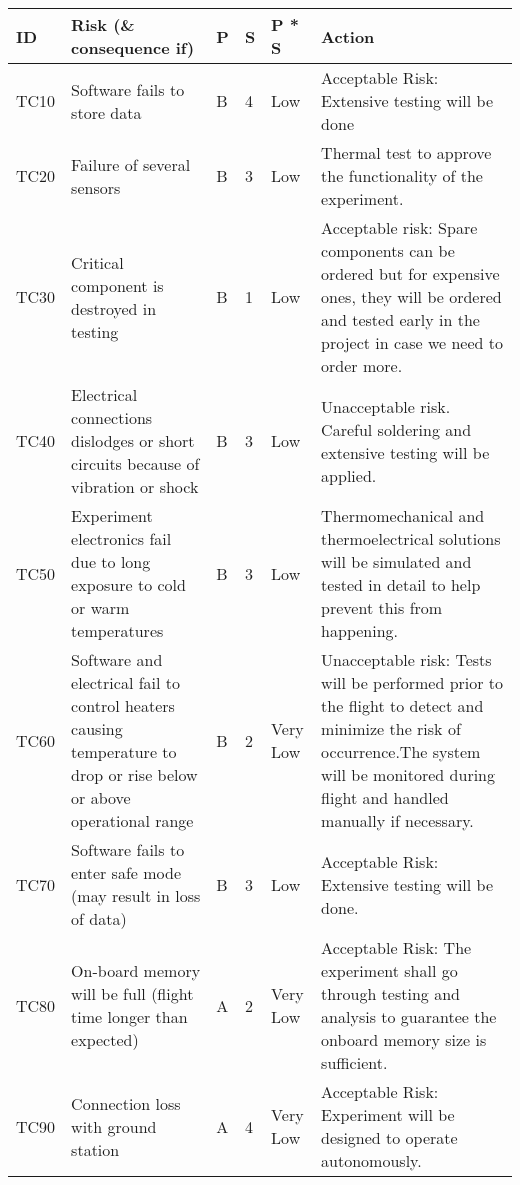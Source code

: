 \begin{longtable}{|m{}| m{} |m{} |m{}|m{}| m{}|}

\hline
\textbf{ID} & \textbf{Risk (\& consequence if)} & \textbf{P} & \textbf{S} & \textbf{P * S} & \textbf{Action} \\ \hline
TC10 & Software fails to store data & B & 4 & \cellcolor[HTML]{FCFF2F}Low & Acceptable Risk: Extensive testing will be done \\ \hline
TC20 & Failure of several sensors & B & 3 & \cellcolor[HTML]{FCFF2F}Low & Thermal test to approve the functionality of the experiment. \\ \hline
TC30 & Critical component is destroyed in testing & B & 1 & \cellcolor[HTML]{FCFF2F}Low & Acceptable risk: Spare components can be ordered but for expensive ones, they will be ordered and tested early in the project in case we need to order more. \\ \hline
TC40 & Electrical connections dislodges or short circuits because of vibration or shock & B & 3 & \cellcolor[HTML]{FCFF2F}Low & Unacceptable risk. Careful soldering and extensive testing will be applied. \\ \hline
TC50 & Experiment electronics fail due to long exposure to cold or warm temperatures & B & 3 & \cellcolor[HTML]{FCFF2F}Low & Thermomechanical and thermoelectrical solutions will be simulated and tested in detail to help prevent this from happening. \\ \hline
TC60 & Software and electrical fail to control heaters causing temperature to drop or rise below or above operational range & B & 2 & \cellcolor[HTML]{34FF34}Very Low & Unacceptable risk: Tests will be performed prior to the flight to detect and minimize the risk of occurrence.The system will be monitored during flight and handled manually if necessary. \\ \hline
TC70 & Software fails to enter safe mode (may result in loss of data) & B & 3 & \cellcolor[HTML]{FCFF2F}Low & Acceptable Risk: Extensive testing will be done. \\ \hline
TC80 & On-board memory will be full (flight time longer than expected) & A & 2 & \cellcolor[HTML]{34FF34}Very Low & Acceptable Risk: The experiment shall go through testing and analysis to guarantee the onboard memory size is sufficient.\\ \hline
TC90 & Connection loss with ground station & A & 4 & \cellcolor[HTML]{34FF34}Very Low & Acceptable Risk: Experiment will be designed to operate autonomously. \\ \hline

\end{longtable}
